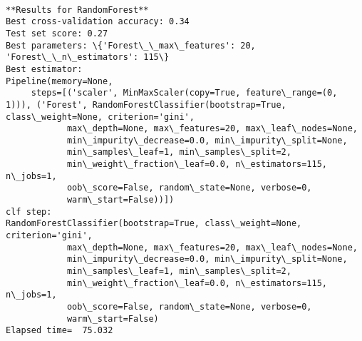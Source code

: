 \documentclass[11pt]{article}
\begin{document}
    
    \begin{center}
    \end{center}
    { \hspace*{\fill} \\}
    
    \begin{Verbatim}[commandchars=\\\{\}]
**Results for RandomForest**
Best cross-validation accuracy: 0.34
Test set score: 0.27
Best parameters: \{'Forest\_\_max\_features': 20, 'Forest\_\_n\_estimators': 115\}
Best estimator:
Pipeline(memory=None,
     steps=[('scaler', MinMaxScaler(copy=True, feature\_range=(0, 1))), ('Forest', RandomForestClassifier(bootstrap=True, class\_weight=None, criterion='gini',
            max\_depth=None, max\_features=20, max\_leaf\_nodes=None,
            min\_impurity\_decrease=0.0, min\_impurity\_split=None,
            min\_samples\_leaf=1, min\_samples\_split=2,
            min\_weight\_fraction\_leaf=0.0, n\_estimators=115, n\_jobs=1,
            oob\_score=False, random\_state=None, verbose=0,
            warm\_start=False))])
clf step:
RandomForestClassifier(bootstrap=True, class\_weight=None, criterion='gini',
            max\_depth=None, max\_features=20, max\_leaf\_nodes=None,
            min\_impurity\_decrease=0.0, min\_impurity\_split=None,
            min\_samples\_leaf=1, min\_samples\_split=2,
            min\_weight\_fraction\_leaf=0.0, n\_estimators=115, n\_jobs=1,
            oob\_score=False, random\_state=None, verbose=0,
            warm\_start=False)
Elapsed time=  75.032

    \end{Verbatim}
\end{document}
